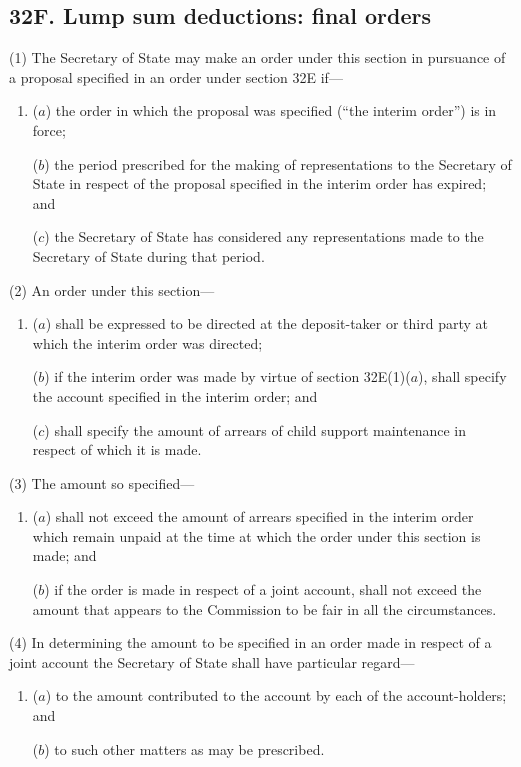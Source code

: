 \documentclass[a4paper]{article}
\begin{document}
\subsection{32F. Lump sum deductions: final orders}

(1) The Secretary of State may make an order under this section in pursuance of a proposal specified in an order under section 32E if---
\begin{enumerate}\item[]
($a$)
the order in which the proposal was specified (“the interim order”) is in force;

($b$)
the period prescribed for the making of representations to the Secretary of State in respect of the proposal specified in the interim order has expired; and

($c$)
the Secretary of State has considered any representations made to the Secretary of State during that period.
\end{enumerate}

(2) An order under this section---
\begin{enumerate}\item[]
($a$)
shall be expressed to be directed at the deposit-taker or third party at which the interim order was directed;

($b$)
if the interim order was made by virtue of section 32E(1)($a$), shall specify the account specified in the interim order; and

($c$)
shall specify the amount of arrears of child support maintenance in respect of which it is made.
\end{enumerate}

(3) The amount so specified---
\begin{enumerate}\item[]
($a$) shall not exceed the amount of arrears specified in the interim order which remain unpaid at the time at which the order under this section is made; and

($b$) if the order is made in respect of a joint account, shall not exceed the amount that appears to the Commission to be fair in all the circumstances.
\end{enumerate}

(4)
In determining the amount to be specified in an order made in respect of a joint account the Secretary of State shall have particular regard---
\begin{enumerate}\item[]
($a$) to the amount contributed to the account by each of the account-holders; and

($b$) to such other matters as may be prescribed.
\end{enumerate}
\end{document}
